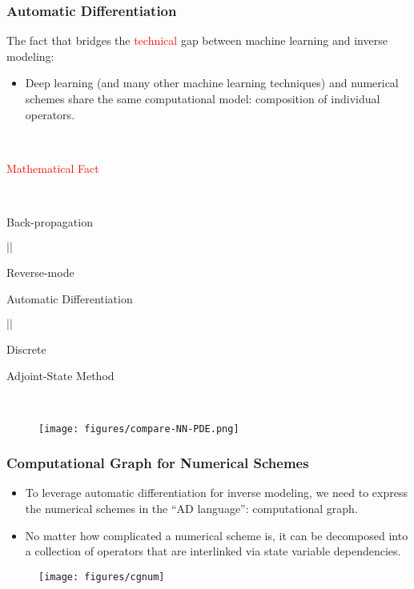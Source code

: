 \documentclass[usenames,dvipsnames]{beamer}
\begin{document}
\begin{frame}
	\frametitle{Automatic Differentiation}
	The fact that bridges the \textcolor{red}{technical} gap between machine learning and inverse modeling:
	\begin{itemize}
		\item Deep learning (and many other machine learning techniques) and numerical schemes share the same computational model: composition of individual operators. 
	\end{itemize}
	
	
	\begin{minipage}[t]{0.4\textwidth}
		
		\
		
		
		
		\begin{center}
			\textcolor{red}{Mathematical Fact}
			
			\
			
			Back-propagation 
			
			$||$
			
			Reverse-mode
			
			Automatic Differentiation 
			
			$||$
			
			Discrete 
			
			Adjoint-State Method
		\end{center}
	\end{minipage}~
	\begin{minipage}[t]{0.6\textwidth}
		\begin{figure}[hbt]
			\texttt{[image: figures/compare-NN-PDE.png]}
		\end{figure}
	\end{minipage}
	
\end{frame}

\begin{frame}
	\frametitle{Computational Graph for Numerical Schemes}
	
	\begin{itemize}
		\item To leverage automatic differentiation for inverse modeling, we need to express the numerical schemes in the ``AD language'': computational graph. 
		\item No matter how complicated a numerical scheme is, it can be decomposed into a collection of operators that are interlinked via state variable dependencies. 
	\end{itemize}
	
	\begin{figure}[hbt]
		\texttt{[image: figures/cgnum]}
	\end{figure}
	
	
	
\end{frame}
\end{document}
